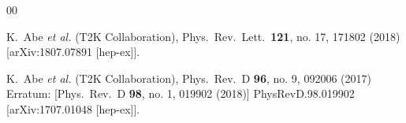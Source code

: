 \documentclass[aps,prl,twocolumn,superscriptaddress,nofootinbib]{revtex4}
\begin{document}
\begin{thebibliography}{00}

  K.~Abe {\it et al.} (T2K Collaboration),
  Phys.\ Rev.\ Lett.\  {\bf 121}, no. 17, 171802 (2018)
  [arXiv:1807.07891 [hep-ex]].
  
  K.~Abe {\it et al.} (T2K Collaboration),
  Phys.\ Rev.\ D {\bf 96}, no. 9, 092006 (2017)
  Erratum: [Phys.\ Rev.\ D {\bf 98}, no. 1, 019902 (2018)]
  PhysRevD.98.019902
  [arXiv:1707.01048 [hep-ex]].


\end{thebibliography}
\end{document}
